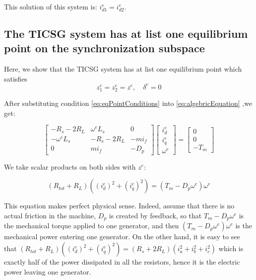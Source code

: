 \documentclass[letterpaper, 10 pt, conference]{ieeeconf}  %
\begin{document}
This solution of this system is: $i_{d1}^{e}=i_{d2}^{e}$.



\subsection{The TICSG system has at list one equilibrium point on the synchronization subspace}
Here, we show that the TICSG system has at list one equilibrium point which satisfies 
\begin{equation}
z_1^{e}=z_2^{e}=z^{e},\quad \delta^e=0\label{eq:eqPointConditions}
\end{equation}

After substituting condition \eqref{eq:eqPointConditions} into \eqref{eq:algebricEquation} ,we get:

\begin{equation}
\left[\begin{array}{ccc}
-R_{s}-2R_{L} & \omega^{e}L_{s} & 0\\
-\omega^{e}L_{s} & -R_{s}-2R_{L} & -mi_{f}\\
0 & mi_{f} & -D_{p}
\end{array}\right]\left[\begin{array}{c}
i_{d}^{e}\\
i_{q}^{e}\\
\omega^{e}
\end{array}\right]=\left[\begin{array}{c}
0\\
0\\
-T_{m}
\end{array}\right]\label{eq:equilbrium_algebric_eq}
\end{equation}

We take scalar products on both sides with $z^{e}$:

\[
\left(R_{tot}+R_{L}\right)\left((i_{d}^{e})^{2}+(i_{q}^{e})^{2}\right)=\left(T_{m}-D_{p}\omega^{e}\right)\omega^{e}
\]

This equation makes perfect physical sense. Indeed, assume that there
is no actual friction in the machine, $D_{p}$ is created by feedback,
so that $T_{m}-D_{p}\omega^{e}$ is the mechanical torque applied
to one generator, and then $\left(T_{m}-D_{p}\omega^{e}\right)\omega^{e}$
is the mechanical power entering one generator. On the other hand,
it is easy to see that $\left(R_{tot}+R_{L}\right)\left((i_{d}^{e})^{2}+(i_{q}^{e})^{2}\right)=\left(R_{s}+2R_{L}\right)\left(i_{a}^{2}+i_{b}^{2}+i_{c}^{2}\right)$
which is exactly half of the power dissipated in all the resistors,
hence it is the electric power leaving one generator.
\end{document}
